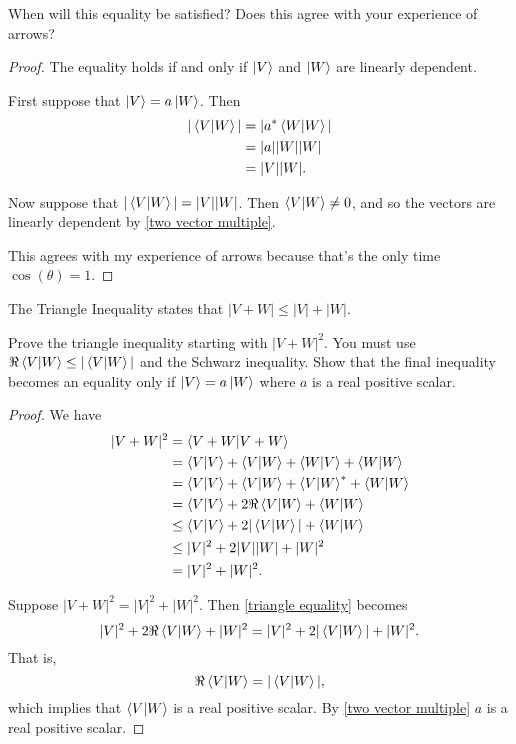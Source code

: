 \begin{exercise}
When will this equality be satisfied? Does this agree with your experience of arrows?
\end{exercise}

\begin{proof}
The equality holds if and only if $\ket{V}$ and $\ket{W}$ are linearly dependent.

First suppose that $\ket{V} = a\ket{W}$. Then
\begin{align*}
    |\braket{V}{W}| &= |a^*\braket{W}{W}| \\
    &= |a||W||W| \\
    &= |V||W|.
\end{align*}

Now suppose that $|\braket{V}{W}| = |V||W|$. Then $\braket{V}{W} \neq 0$, and so the vectors are linearly dependent by \eqref{two vector multiple}.

This agrees with my experience of arrows because that's the only time $\cos{(\theta)} = 1$.
\end{proof}

\begin{theorem}\label{triangle inequality}
The Triangle Inequality states that $|V + W| \leq |V| + |W|$.
\end{theorem}

\begin{exercise}
Prove the triangle inequality starting with $|V + W|^2$. You must use $\real \braket{V}{W} \leq |\braket{V}{W}|$ and the Schwarz inequality. Show that the final inequality becomes an equality only if $\ket{V} = a\ket{W}$ where $a$ is a real positive scalar.
\end{exercise}

\begin{proof} We have
\begin{align}\label{triangle equality}
    |V + W|^2 &= \braket{V + W}{V + W} \nonumber \\
    &= \braket{V}{V} + \braket{V}{W} + \braket{W}{V} + \braket{W}{W} \nonumber \\
    &= \braket{V}{V} + \braket{V}{W} + \braket{V}{W}^* + \braket{W}{W} \nonumber \\
    &= \braket{V}{V} + 2\real\braket{V}{W} + \braket{W}{W} \nonumber \\
    &\leq \braket{V}{V} + 2|\braket{V}{W}| + \braket{W}{W} \\
    &\leq |V|^2 + 2|V||W| + |W|^2 \nonumber \\
    &= |V|^2 + |W|^2. \nonumber
\end{align}

Suppose $|V + W|^2 = |V|^2 + |W|^2$. Then \eqref{triangle equality} becomes
\begin{equation*}
    |V|^2 + 2\real \braket{V}{W} + |W|^2 = |V|^2 + 2|\braket{V}{W}| + |W|^2.
\end{equation*}
That is,
\begin{equation*}
    \real \braket{V}{W} = |\braket{V}{W}|,
\end{equation*}
which implies that $\braket{V}{W}$ is a real positive scalar. By \eqref{two vector multiple} $a$ is a real positive scalar.
\end{proof}

